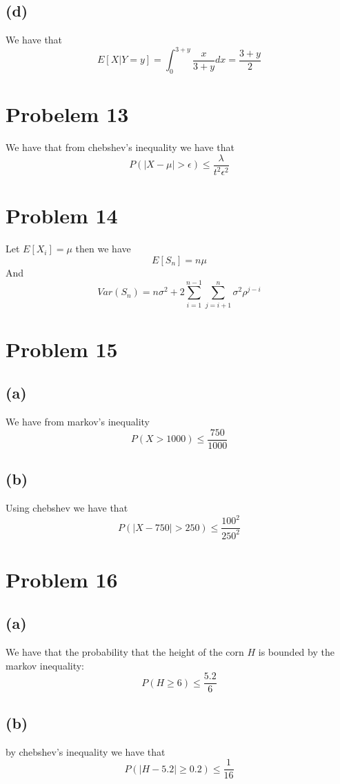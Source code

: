 \subsection{(d)}
We have that
$$E[X|Y=y]=\int_{0}^{3+y}\frac{x}{3+y}dx=\frac{3+y}{2}$$
\section*{Probelem 13}
We have that from chebshev's inequality we have that
$$P(|X-\mu|>\epsilon)\leq \frac{\lambda}{t^2\epsilon^2}$$
\section*{Problem 14}
Let $E[X_i]=\mu$ then we have 
$$E[S_n]=n\mu$$
And 
$$Var(S_n)=n\sigma^2+2\sum_{i=1}^{n-1}\sum_{j=i+1}^{n}\sigma^2 \rho^{j-i}$$
\section*{Problem 15}
\subsection*{(a)}
We have from markov's inequality 
$$P(X>1000)\leq \boxed{\frac{750}{1000}}$$
\subsection*{(b)}
Using chebshev we have that 
$$P(|X-750|>250)\leq \boxed{\frac{100^2}{250^2}}$$
\section*{Problem 16}
\subsection*{(a)}
We have that the probability that the height of the corn $H$
is bounded by the markov inequality:
$$P(H\geq 6)\leq \frac{5.2}{6}$$
\subsection*{(b)}
by chebshev's inequality we have that
$$P(|H-5.2|\geq 0.2)\leq \frac{1}{16}$$










